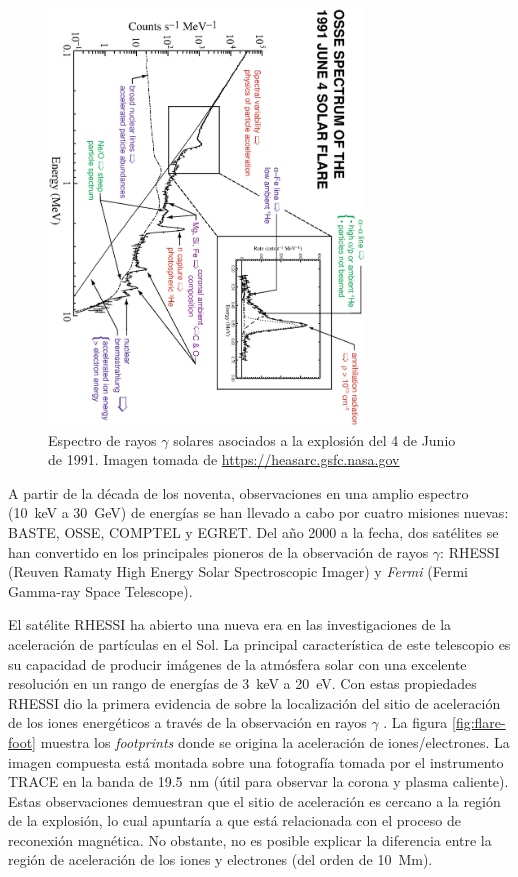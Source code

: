\begin{figure}
        \centering
        \includegraphics[width=0.75\textwidth,angle=90]{gamma-espectro.eps}
        \caption{Espectro de rayos $\gamma$ solares asociados a la explosión del \num{4} de Junio de \num{1991}. Imagen tomada de \url{https://heasarc.gsfc.nasa.gov}}
        \label{fig:gamma-espectro}
\end{figure}

A partir de la década de los noventa, observaciones en una amplio espectro (\SI{10}{\kilo\electronvolt} a \SI{30}{\giga\electronvolt}) de energías se han llevado a cabo por cuatro misiones nuevas: BASTE, OSSE, COMPTEL y EGRET. Del año \num{2000} a la fecha, dos satélites se han convertido en los principales pioneros de la observación de rayos $\gamma$: RHESSI (Reuven Ramaty High Energy Solar Spectroscopic Imager) y \emph{Fermi} (Fermi Gamma-ray Space Telescope).

El satélite RHESSI ha abierto una nueva era en las investigaciones de la aceleración de partículas en el Sol. La principal característica de este telescopio es su capacidad de producir imágenes de la atmósfera solar con una excelente resolución en un rango de energías de \SI{3}{\kilo\electronvolt} a \SI{20}{\electronvolt}. Con estas propiedades RHESSI dio la primera evidencia de sobre la localización del sitio de aceleración de los iones energéticos a través de la observación en rayos $\gamma$ \cite{hurford03,hurford06}. La figura \ref{fig:flare-foot} muestra los \emph{footprints} donde se origina la aceleración de iones/electrones. La imagen compuesta está montada sobre una fotografía tomada por el instrumento TRACE en la banda de \SI{19.5}{\nano\metre} (útil para observar la corona y plasma caliente). Estas observaciones demuestran que el sitio de aceleración es cercano a la región de la explosión, lo cual apuntaría a que está relacionada con el proceso de reconexión magnética. No obstante, no es posible explicar la diferencia entre la región de aceleración de los iones y electrones (del orden de \SI{10}{\mega\metre}).

